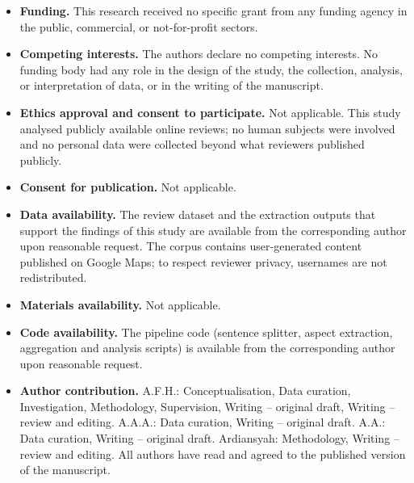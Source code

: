 \documentclass[pdflatex,sn-mathphys-num]{sn-jnl}
\begin{document}
\begin{itemize}
\item \textbf{Funding.} This research received no specific grant from any funding agency in the public, commercial, or not-for-profit sectors.
\item \textbf{Competing interests.} The authors declare no competing interests. No funding body had any role in the design of the study, the collection, analysis, or interpretation of data, or in the writing of the manuscript.
\item \textbf{Ethics approval and consent to participate.} Not applicable. This study analysed publicly available online reviews; no human subjects were involved and no personal data were collected beyond what reviewers published publicly.
\item \textbf{Consent for publication.} Not applicable.
\item \textbf{Data availability.} The review dataset and the extraction outputs that support the findings of this study are available from the corresponding author upon reasonable request. The corpus contains user-generated content published on Google Maps; to respect reviewer privacy, usernames are not redistributed.
\item \textbf{Materials availability.} Not applicable.
\item \textbf{Code availability.} The pipeline code (sentence splitter, aspect extraction, aggregation and analysis scripts) is available from the corresponding author upon reasonable request.
\item \textbf{Author contribution.} A.F.H.: Conceptualisation, Data curation, Investigation, Methodology, Supervision, Writing -- original draft, Writing -- review and editing. A.A.A.: Data curation, Writing -- original draft. A.A.: Data curation, Writing -- original draft. Ardiansyah: Methodology, Writing -- review and editing. All authors have read and agreed to the published version of the manuscript.
\end{itemize}


\end{document}
